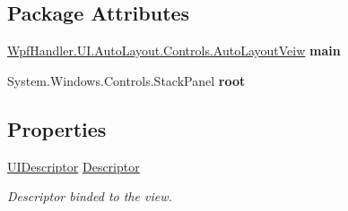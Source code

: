 \subsection*{Package Attributes}
\begin{DoxyCompactItemize}
\item 
\mbox{\label{class_wpf_handler_1_1_u_i_1_1_auto_layout_1_1_controls_1_1_auto_layout_veiw_a40493f222d9ffcdd653b767b68c52a44}} 
\mbox{\hyperlink{class_wpf_handler_1_1_u_i_1_1_auto_layout_1_1_controls_1_1_auto_layout_veiw}{Wpf\+Handler.\+U\+I.\+Auto\+Layout.\+Controls.\+Auto\+Layout\+Veiw}} {\bfseries main}
\item 
\mbox{\label{class_wpf_handler_1_1_u_i_1_1_auto_layout_1_1_controls_1_1_auto_layout_veiw_a7918966372bf9bad5dd25c837b748517}} 
System.\+Windows.\+Controls.\+Stack\+Panel {\bfseries root}
\end{DoxyCompactItemize}
\subsection*{Properties}
\begin{DoxyCompactItemize}
\item 
\mbox{\hyperlink{class_wpf_handler_1_1_u_i_1_1_auto_layout_1_1_u_i_descriptor}{U\+I\+Descriptor}} \mbox{\hyperlink{class_wpf_handler_1_1_u_i_1_1_auto_layout_1_1_controls_1_1_auto_layout_veiw_abd1e3e95a1ed31eb35a7c6a531f51588}{Descriptor}}
\begin{DoxyCompactList}\small\item\em Descriptor binded to the view. \end{DoxyCompactList}\end{DoxyCompactItemize}
